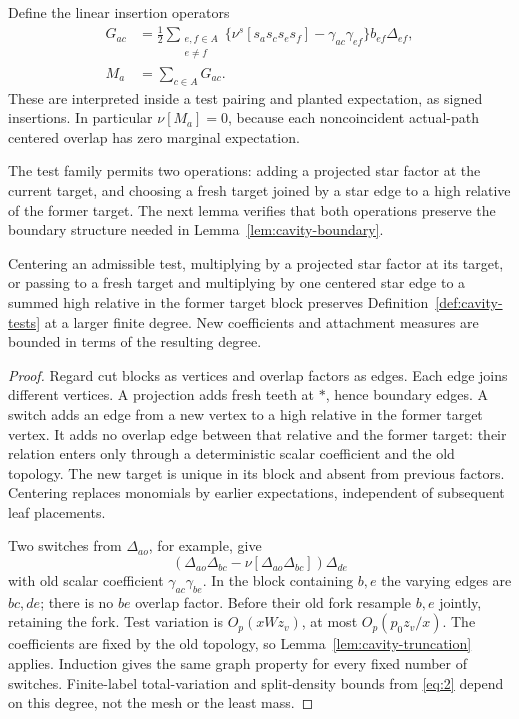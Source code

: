 Define the linear insertion operators
\begin{equation}\label{eq:23}\tag{23}
 \begin{split}
 G_{ac}&=\frac12\sum_{\substack{e,f\in A\\e\ne f}}
 \{\nu^s[s_as_cs_es_f]-\gamma_{ac}\gamma_{ef}\}
                                      b_{ef}\Delta_{ef},\\
 M_a&=\sum_{c\in A}G_{ac}.
 \end{split}
\end{equation}
These are interpreted inside a test pairing and planted
expectation, as signed insertions. In particular
\(\nu[M_a]=0\), because each noncoincident actual-path
centered overlap has zero marginal expectation.

The test family permits two operations: adding a projected star
factor at the current target, and choosing a fresh target joined by
a star edge to a high relative of the former target. The next lemma
verifies that both operations preserve the boundary structure needed
in Lemma~\ref{lem:cavity-boundary}.

\begin{lemma}\label{lem:cavity-family}
Centering an admissible test, multiplying by a projected
star factor at its target, or passing to a fresh target
and multiplying by one centered star edge to a summed
high relative in the former target block preserves
Definition~\ref{def:cavity-tests} at a larger finite degree.
New coefficients and attachment measures are bounded in
terms of the resulting degree.
\end{lemma}

\begin{proof}
Regard cut blocks as vertices and overlap factors as
edges. Each edge joins different vertices. A projection
adds fresh teeth at \(*\), hence boundary edges.
A switch adds an edge from a new vertex to a high
relative in the former target vertex. It adds no overlap
edge between that relative and the former target:
their relation enters only through a deterministic
scalar coefficient and the old topology. The new target
is unique in its block and absent from previous factors.
Centering replaces monomials by earlier expectations,
independent of subsequent leaf placements.

Two switches from \(\Delta_{ao}\), for example, give
\[
 (\Delta_{ao}\Delta_{bc}-\nu[\Delta_{ao}\Delta_{bc}])
                                                    \Delta_{de}
\]
with old scalar coefficient \(\gamma_{ac}\gamma_{be}\).
In the block containing \(b,e\) the varying edges are
\(bc,de\); there is no \(be\) overlap factor. Before
their old fork resample \(b,e\) jointly, retaining
the fork. Test variation is \(O_p(xWz_v)\), at most
\(O_p(p_0z_v/x)\). The coefficients are fixed by the
old topology, so Lemma~\ref{lem:cavity-truncation}
applies. Induction gives the same graph property
for every fixed number of switches. Finite-label
total-variation and split-density bounds from
\eqref{eq:2} depend on this degree, not the mesh
or the least mass.
\end{proof}

